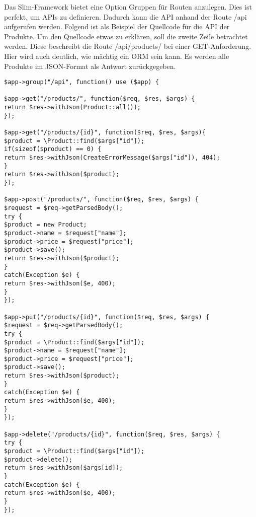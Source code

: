 Das Slim-Framework bietet eine Option Gruppen für Routen anzulegen. Dies ist perfekt, um APIs zu definieren. Dadurch kann die \ac{API} anhand der Route /api aufgerufen werden. Folgend ist als Beispiel der Quellcode für die \ac{API} der Produkte. Um den Quellcode etwas zu erklären, soll die zweite Zeile betrachtet werden. Diese beschreibt die Route /api/products/ bei einer GET-Anforderung. Hier wird auch deutlich, wie mächtig ein \ac{ORM} sein kann. Es werden alle Produkte im \ac{JSON}-Format als Antwort zurückgegeben.
\lstset{language=PHP} 
\begin{lstlisting}[frame=single]
$app->group("/api", function() use ($app) {  

$app->get("/products/", function($req, $res, $args) {
return $res->withJson(Product::all());
});

$app->get("/products/{id}", function($req, $res, $args){
$product = \Product::find($args["id"]);
if(sizeof($product) == 0) {
return $res->withJson(CreateErrorMessage($args["id"]), 404);
}
return $res->withJson($product);
});

$app->post("/products/", function($req, $res, $args) {
$request = $req->getParsedBody();
try {
$product = new Product;
$product->name = $request["name"];
$product->price = $request["price"];
$product->save();
return $res->withJson($product);
}
catch(Exception $e) {
return $res->withJson($e, 400);
}
});

$app->put("/products/{id}", function($req, $res, $args) {
$request = $req->getParsedBody();
try {
$product = \Product::find($args["id"]);
$product->name = $request["name"];
$product->price = $request["price"];
$product->save();
return $res->withJson($product);
}
catch(Exception $e) {
return $res->withJson($e, 400);
}
});

$app->delete("/products/{id}", function($req, $res, $args) {
try {
$product = \Product::find($args["id"]);
$product->delete();
return $res->withJson($args[id]);
}
catch(Exception $e) {
return $res->withJson($e, 400);
}
});
\end{lstlisting}